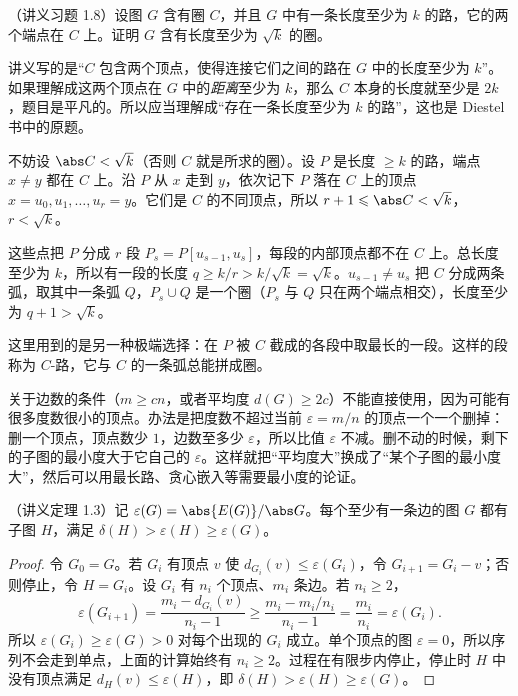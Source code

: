 \begin{workedexample}\label{we:longest-paths:sqrt-k}
（讲义习题 1.8）设图 $G$ 含有圈 $C$，并且 $G$ 中有一条长度至少为 $k$ 的路，它的两个端点在 $C$ 上。证明 $G$ 含有长度至少为 $\sqrt k$ 的圈。
\end{workedexample}
\begin{remark}
讲义写的是“$C$ 包含两个顶点，使得连接它们之间的路在 $G$ 中的长度至少为 $k$”。如果理解成这两个顶点在 $G$ 中的\emph{距离}至少为 $k$，那么 $C$ 本身的长度就至少是 $2k$，题目是平凡的。所以应当理解成“存在一条长度至少为 $k$ 的路”，这也是 Diestel 书中的原题。
\end{remark}
\begin{solution}
不妨设 $\abs C<\sqrt k$（否则 $C$ 就是所求的圈）。设 $P$ 是长度 $\geqslant k$ 的路，端点 $x\neq y$ 都在 $C$ 上。沿 $P$ 从 $x$ 走到 $y$，依次记下 $P$ 落在 $C$ 上的顶点 $x=u_0,u_1,\dots,u_r=y$。它们是 $C$ 的不同顶点，所以 $r+1\leqslant\abs C<\sqrt k$，$r<\sqrt k$。

这些点把 $P$ 分成 $r$ 段 $P_s=P[u_{s-1},u_s]$，每段的内部顶点都不在 $C$ 上。总长度至少为 $k$，所以有一段的长度 $q\geqslant k/r>k/\sqrt k=\sqrt k$。$u_{s-1}\neq u_s$ 把 $C$ 分成两条弧，取其中一条弧 $Q$，$P_s\cup Q$ 是一个圈（$P_s$ 与 $Q$ 只在两个端点相交），长度至少为 $q+1>\sqrt k$。
\end{solution}

\begin{remark}
这里用到的是另一种极端选择：在 $P$ 被 $C$ 截成的各段中取最长的一段。这样的段称为 $C$-路，它与 $C$ 的一条弧总能拼成圈。
\end{remark}


关于边数的条件（$m\geqslant cn$，或者平均度 $d(G)\geqslant2c$）不能直接使用，因为可能有很多度数很小的顶点。办法是把度数不超过当前 $\varepsilon=m/n$ 的顶点一个一个删掉：删一个顶点，顶点数少 $1$，边数至多少 $\varepsilon$，所以比值 $\varepsilon$ 不减。删不动的时候，剩下的子图的最小度大于它自己的 $\varepsilon$。这样就把“平均度大”换成了“某个子图的最小度大”，然后可以用最长路、贪心嵌入等需要最小度的论证。

\begin{theorem}\label{thm:longest-paths:min-degree-subgraph}
（讲义定理 1.3）记 $\varepsilon(G)=\abs{E(G)}/\abs G$。每个至少有一条边的图 $G$ 都有子图 $H$，满足 $\delta(H)>\varepsilon(H)\geqslant\varepsilon(G)$。
\end{theorem}
\begin{proof}
令 $G_0=G$。若 $G_i$ 有顶点 $v$ 使 $d_{G_i}(v)\leqslant\varepsilon(G_i)$，令 $G_{i+1}=G_i-v$；否则停止，令 $H=G_i$。设 $G_i$ 有 $n_i$ 个顶点、$m_i$ 条边。若 $n_i\geqslant2$，
\[
\varepsilon(G_{i+1})=\frac{m_i-d_{G_i}(v)}{n_i-1}\geqslant\frac{m_i-m_i/n_i}{n_i-1}=\frac{m_i}{n_i}=\varepsilon(G_i).
\]
所以 $\varepsilon(G_i)\geqslant\varepsilon(G)>0$ 对每个出现的 $G_i$ 成立。单个顶点的图 $\varepsilon=0$，所以序列不会走到单点，上面的计算始终有 $n_i\geqslant2$。过程在有限步内停止，停止时 $H$ 中没有顶点满足 $d_H(v)\leqslant\varepsilon(H)$，即 $\delta(H)>\varepsilon(H)\geqslant\varepsilon(G)$。
\end{proof}

